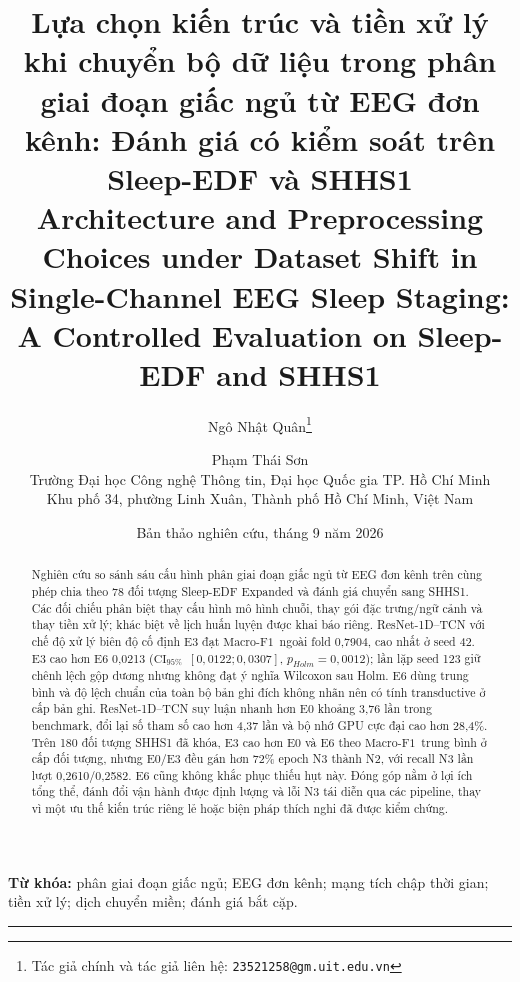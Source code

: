 \documentclass[10pt,a4paper]{article}
\title{\textbf{Lựa chọn kiến trúc và tiền xử lý khi chuyển bộ dữ liệu trong phân giai đoạn giấc ngủ từ EEG đơn kênh: Đánh giá có kiểm soát trên Sleep-EDF và SHHS1}\\[0.55em]
\large Architecture and Preprocessing Choices under Dataset Shift in Single-Channel EEG Sleep Staging: A Controlled Evaluation on Sleep-EDF and SHHS1}
\author{Ngô Nhật Quân\thanks{Tác giả chính và tác giả liên hệ: \texttt{23521258@gm.uit.edu.vn}} \and Phạm Thái Sơn\\
\small Trường Đại học Công nghệ Thông tin, Đại học Quốc gia TP. Hồ Chí Minh\\
\small Khu phố 34, phường Linh Xuân, Thành phố Hồ Chí Minh, Việt Nam}
\date{Bản thảo nghiên cứu, tháng 9 năm 2026}
\newcommand{\mf}{\ensuremath{\mathrm{Macro\mbox{-}F1}}}
\newcommand{\ci}{\ensuremath{\mathrm{CI}_{95\%}}}
\begin{document}
\renewcommand{\refname}{Tài liệu tham khảo}
\maketitle

\renewcommand{\abstractname}{Tóm tắt}
\begin{abstract}
Nghiên cứu so sánh sáu cấu hình phân giai đoạn giấc ngủ từ EEG đơn kênh trên cùng phép chia theo 78 đối tượng Sleep-EDF Expanded và đánh giá chuyển sang SHHS1. Các đối chiếu phân biệt thay cấu hình mô hình chuỗi, thay gói đặc trưng/ngữ cảnh và thay tiền xử lý; khác biệt về lịch huấn luyện được khai báo riêng. ResNet-1D--TCN với chế độ xử lý biên độ cố định E3 đạt \mf\ ngoài fold 0,7904, cao nhất ở seed 42. E3 cao hơn E6 0,0213 (\ci\ $[0,0122;0,0307]$, $p_{Holm}=0,0012$); lần lặp seed 123 giữ chênh lệch gộp dương nhưng không đạt ý nghĩa Wilcoxon sau Holm. E6 dùng trung bình và độ lệch chuẩn của toàn bộ bản ghi đích không nhãn nên có tính transductive ở cấp bản ghi. ResNet-1D--TCN suy luận nhanh hơn E0 khoảng 3,76 lần trong benchmark, đổi lại số tham số cao hơn 4,37 lần và bộ nhớ GPU cực đại cao hơn 28,4\%. Trên 180 đối tượng SHHS1 đã khóa, E3 cao hơn E0 và E6 theo \mf\ trung bình ở cấp đối tượng, nhưng E0/E3 đều gán hơn 72\% epoch N3 thành N2, với recall N3 lần lượt 0,2610/0,2582. E6 cũng không khắc phục thiếu hụt này. Đóng góp nằm ở lợi ích tổng thể, đánh đổi vận hành được định lượng và lỗi N3 tái diễn qua các pipeline, thay vì một ưu thế kiến trúc riêng lẻ hoặc biện pháp thích nghi đã được kiểm chứng.
\end{abstract}

\noindent\textbf{Từ khóa:} phân giai đoạn giấc ngủ; EEG đơn kênh; mạng tích chập thời gian; tiền xử lý; dịch chuyển miền; đánh giá bắt cặp.

\begin{center}
\rule{0.95\textwidth}{0.35pt}
\end{center}
\end{document}
